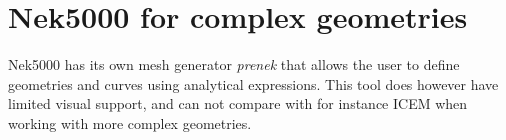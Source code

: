 


\section{Nek5000 for complex geometries}
Nek5000 has its own mesh generator \textit{prenek} that allows the user to define geometries 
and curves using analytical expressions. This tool does however have limited visual support, and
can not compare with for instance ICEM when working with more complex geometries. 

